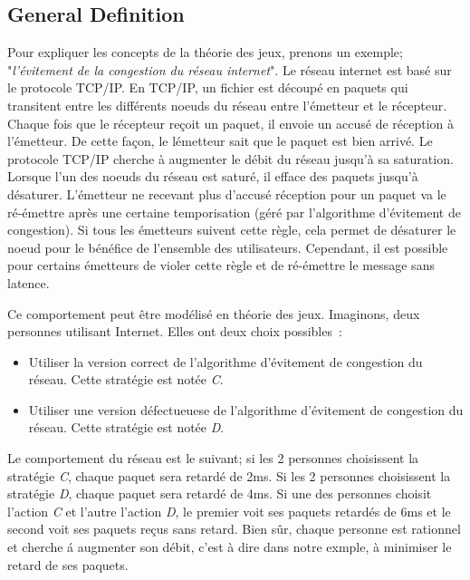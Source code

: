 \subsection{General Definition}
Pour expliquer les concepts de la th\'eorie des jeux, prenons un exemple; "\emph{l'\'evitement de la congestion du r\'eseau internet}". Le r\'eseau internet est bas\'e sur le protocole TCP/IP. En TCP/IP, un fichier est d\'ecoup\'e en paquets qui transitent entre les diff\'erents noeuds du r\'eseau entre l'\'emetteur et le r\'ecepteur. Chaque fois que le r\'ecepteur re\c{c}oit un paquet, il envoie un accus\'e de r\'eception \`a l'\'emetteur. De cette fa\c{c}on, le l\'emetteur sait que le paquet est bien arriv\'e. Le protocole TCP/IP cherche \`a augmenter le d\'ebit du r\'eseau jusqu'\`a sa saturation. Lorsque l'un des noeuds du r\'eseau est satur\'e, il efface des paquets jusqu'\`a d\'esaturer. L'\'emetteur ne recevant plus d'accus\'e r\'eception pour un paquet va le r\'e-\'emettre apr\`es une certaine temporisation (g\'er\'e par l'algorithme d'\'evitement de congestion). Si tous les \'emetteurs suivent cette r\`egle, cela  permet de d\'esaturer le noeud pour le b\'en\'efice de l'ensemble des utilisateurs. Cependant, il est possible pour certains \'emetteurs de violer cette r\`egle et de r\'e-\'emettre le message sans latence. 

Ce comportement peut \^etre mod\'elis\'e en th\'eorie des jeux.  Imaginons, deux personnes utilisant Internet. Elles ont deux choix possibles\ :
\begin{itemize}
\item Utiliser la version correct de l'algorithme d'\'evitement de congestion du r\'eseau. Cette strat\'egie est not\'ee \emph{C}.
\item Utiliser une version d\'efectueuese de l'algorithme d'\'evitement de congestion du r\'eseau. Cette strat\'egie est not\'ee \emph{D}.
\end{itemize}

Le comportement du r\'eseau est le suivant; si les 2 personnes choisissent la strat\'egie \emph{C}, chaque paquet sera retard\'e de 2ms. Si les 2 personnes choisissent la strat\'egie \emph{D}, chaque paquet sera retard\'e de 4ms. Si une des personnes choisit l'action \emph{C} et l'autre l'action \emph{D}, le premier voit ses paquets retard\'es de 6ms et le second voit ses paquets re\c{c}us sans retard. Bien s\^ur, chaque personne est rationnel et cherche \'a augmenter son d\'ebit, c'est \`a dire dans notre exmple, \`a minimiser le retard de ses paquets.

